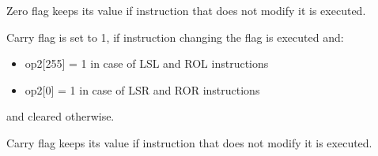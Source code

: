 \documentclass[notconfidential]{tropic_design_spec}
\begin{document}
Zero flag keeps its value if instruction that does not modify it is executed.


Carry flag is set to 1, if instruction changing the flag is executed and:
\begin{itemize}
    \item op2[255] = 1 in case of LSL and ROL instructions
    \item op2[0] = 1 in case of LSR and ROR instructions
\end{itemize}
and cleared otherwise.

Carry flag keeps its value if instruction that does not modify it is executed.
\end{document}
